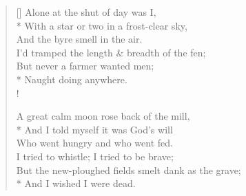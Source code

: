 \documentclass[MAIN]{subfiles}
\begin{document}
\settowidth{\versewidth}{Past touch \& sight \& sound,}
\begin{verse}[\versewidth]
Alone at the shut of day was I,\\*
With a star or two in a frost-clear sky,\\
\vin And the byre smell in the air.\\
I'd tramped the length \& breadth of the fen;\\
But never a farmer wanted men;\\*
\vin Naught doing anywhere.\\!

A great calm moon rose back of the mill,\\*
And I told myself it was God's will\\
\vin Who went hungry and who went fed.\\
I tried to whistle; I tried to be brave;\\
But the new-ploughed fields smelt dank as the grave;\\*
\vin And I wished I were dead.
\end{verse}
\end{document}
